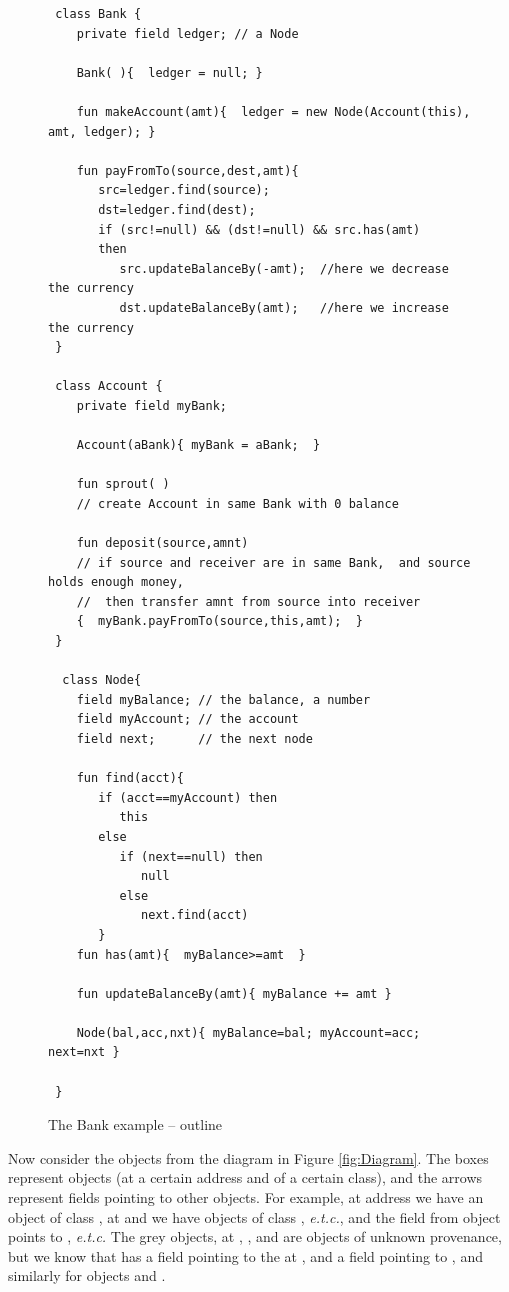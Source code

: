 \documentclass[acmsmall,screen]{acmart}
\begin{document}
\begin{figure}[tbp]
\begin{lstlisting}
 class Bank {
    private field ledger; // a Node

    Bank( ){  ledger = null; }

    fun makeAccount(amt){  ledger = new Node(Account(this), amt, ledger); }
   
    fun payFromTo(source,dest,amt){ 
       src=ledger.find(source);
       dst=ledger.find(dest);
       if (src!=null) && (dst!=null) && src.has(amt) 
       then
          src.updateBalanceBy(-amt);  //here we decrease the currency
          dst.updateBalanceBy(amt);   //here we increase the currency
 }

 class Account {
    private field myBank;

    Account(aBank){ myBank = aBank;  }

    fun sprout( )
    // create Account in same Bank with 0 balance

    fun deposit(source,amnt)
    // if source and receiver are in same Bank,  and source holds enough money,
    //  then transfer amnt from source into receiver
    {  myBank.payFromTo(source,this,amt);  }
 }

  class Node{
    field myBalance; // the balance, a number
    field myAccount; // the account
    field next;      // the next node
    
    fun find(acct){
       if (acct==myAccount) then
          this
       else
          if (next==null) then
             null
          else
             next.find(acct)
       }  
    fun has(amt){  myBalance>=amt  }
       
    fun updateBalanceBy(amt){ myBalance += amt }
    
    Node(bal,acc,nxt){ myBalance=bal; myAccount=acc; next=nxt }
     
 }
\end{lstlisting}
\caption{The Bank example -- outline}
\label{fig:Bank}
 \end{figure}
Now consider the objects from the diagram in Figure \ref{fig:Diagram}.
 The boxes represent objects (at a certain address and of a certain class), and
  the arrows represent fields pointing to other objects. 
  For example, at address  we have an object of class , at
  and   we have objects of class , {\it {e.t.c.}}, and 
 the  field from object   points to  , {\it {e.t.c.}}
 The grey objects, at  ,  ,   and  
 are objects of unknown provenance, but we know that   has
 a field pointing to the  at  , and a field pointing to  , and
 similarly for objects   and  .
\end{document}
